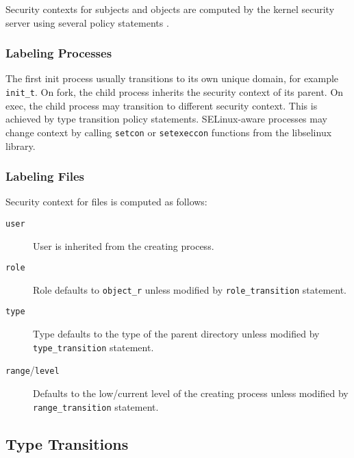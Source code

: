 Security contexts for subjects and objects are computed by the kernel security
server using several policy statements \cite[pp.~31--33]{tsn}.

\subsubsection{Labeling Processes}
The first init process usually transitions to its own unique domain, for example
\texttt{init\_t}. On fork, the child process inherits the security context of
its parent. On exec, the child process may transition to different security
context. This is achieved by type transition policy statements. SELinux-aware
processes may change context by calling \texttt{setcon} or \texttt{setexeccon}
functions from the libselinux library.

\subsubsection{Labeling Files}
Security context for files is computed as follows:
\begin{description}
    \item [\texttt{user}] User is inherited from the creating process.
    \item [\texttt{role}] Role defaults to \texttt{object\_r} unless modified by
        \texttt{role\_transition} statement.
    \item [\texttt{type}] Type defaults to the type of the parent directory
        unless modified by \texttt{type\_transition} statement.
    \item [\texttt{range}/\texttt{level}] Defaults to the low/current level of
        the creating process unless modified by \texttt{range\_transition}
        statement.
\end{description}

\subsection{Type Transitions}

